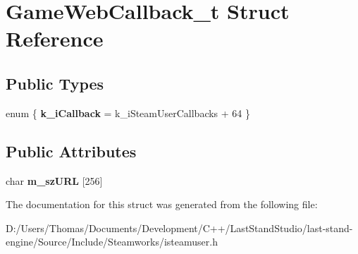 \hypertarget{structGameWebCallback__t}{}\section{Game\+Web\+Callback\+\_\+t Struct Reference}
\label{structGameWebCallback__t}
\subsection*{Public Types}
\begin{DoxyCompactItemize}
\item 
\hypertarget{structGameWebCallback__t_a1e796321a0f91858085b3db9f7af2844}{}enum \{ {\bfseries k\+\_\+i\+Callback} = k\+\_\+i\+Steam\+User\+Callbacks + 64
 \}\label{structGameWebCallback__t_a1e796321a0f91858085b3db9f7af2844}

\end{DoxyCompactItemize}
\subsection*{Public Attributes}
\begin{DoxyCompactItemize}
\item 
\hypertarget{structGameWebCallback__t_a3dfa54118aea9f7d3e233833759174db}{}char {\bfseries m\+\_\+sz\+U\+R\+L} \mbox{[}256\mbox{]}\label{structGameWebCallback__t_a3dfa54118aea9f7d3e233833759174db}

\end{DoxyCompactItemize}


The documentation for this struct was generated from the following file\+:\begin{DoxyCompactItemize}
\item 
D\+:/\+Users/\+Thomas/\+Documents/\+Development/\+C++/\+Last\+Stand\+Studio/last-\/stand-\/engine/\+Source/\+Include/\+Steamworks/isteamuser.\+h\end{DoxyCompactItemize}
